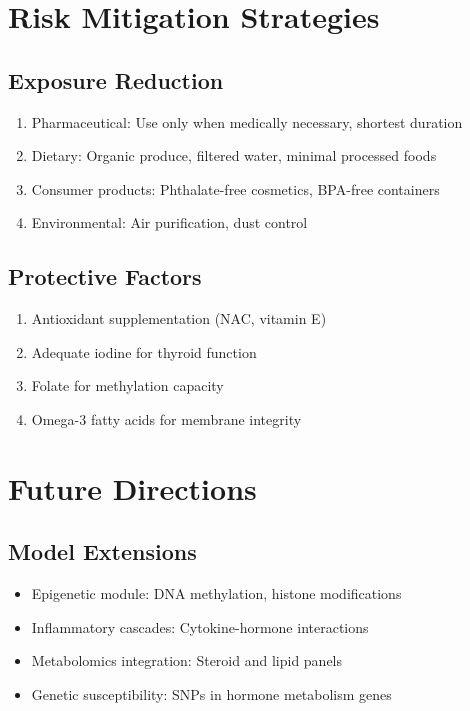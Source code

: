 \documentclass[11pt]{article}
\begin{document}
\section{Risk Mitigation Strategies}

\subsection{Exposure Reduction}
\begin{enumerate}
\item Pharmaceutical: Use only when medically necessary, shortest duration
\item Dietary: Organic produce, filtered water, minimal processed foods
\item Consumer products: Phthalate-free cosmetics, BPA-free containers
\item Environmental: Air purification, dust control
\end{enumerate}

\subsection{Protective Factors}
\begin{enumerate}
\item Antioxidant supplementation (NAC, vitamin E)
\item Adequate iodine for thyroid function
\item Folate for methylation capacity
\item Omega-3 fatty acids for membrane integrity
\end{enumerate}

\section{Future Directions}

\subsection{Model Extensions}
\begin{itemize}
\item Epigenetic module: DNA methylation, histone modifications
\item Inflammatory cascades: Cytokine-hormone interactions
\item Metabolomics integration: Steroid and lipid panels
\item Genetic susceptibility: SNPs in hormone metabolism genes
\end{itemize}
\end{document}

